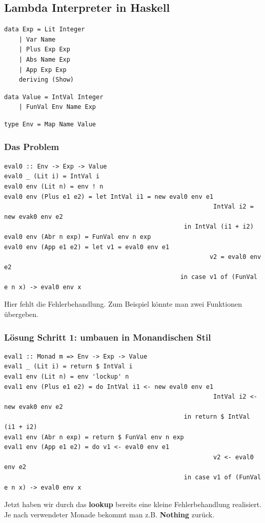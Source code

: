\documentclass[ngerman,a4paper]{report}
\begin{document}
\subsection{Lambda Interpreter in Haskell}
\begin{lstlisting}
data Exp = Lit Integer
	| Var Name
	| Plus Exp Exp
	| Abs Name Exp
	| App Exp Exp
	deriving (Show)
\end{lstlisting}

\begin{lstlisting}
data Value = IntVal Integer
	| FunVal Env Name Exp
\end{lstlisting}

\begin{lstlisting}
type Env = Map Name Value
\end{lstlisting}

\subsubsection{Das Problem}
\begin{lstlisting}
eval0 :: Env -> Exp -> Value
eval0 _ (Lit i) = IntVal i
eval0 env (Lit n) = env ! n
eval0 env (Plus e1 e2) = let IntVal i1 = new eval0 env e1
														 IntVal i2 = new evak0 env e2
												 in IntVal (i1 + i2)
eval0 env (Abr n exp) = FunVal env n exp
eval0 env (App e1 e2) = let v1 = eval0 env e1
														v2 = eval0 env e2
												in case v1 of (FunVal e n x) -> eval0 env x				
\end{lstlisting}
Hier fehlt die Fehlerbehandlung. Zum Beispiel könnte man zwei Funktionen übergeben.\\

\subsubsection{Lösung Schritt 1: umbauen in Monandischen Stil}
\begin{lstlisting}
eval1 :: Monad m => Env -> Exp -> Value
eval1 _ (Lit i) = return $ IntVal i
eval1 env (Lit n) = env 'lockup' n
eval1 env (Plus e1 e2) = do IntVal i1 <- new eval0 env e1
														 IntVal i2 <- new evak0 env e2
												 in return $ IntVal (i1 + i2)
eval1 env (Abr n exp) = return $ FunVal env n exp
eval1 env (App e1 e2) = do v1 <- eval0 env e1
														 v2 <- eval0 env e2
												 in case v1 of (FunVal e n x) -> eval0 env x				
\end{lstlisting}
Jetzt haben wir durch das \textbf{lookup} bereits eine kleine Fehlerbehandlung realisiert. Je nach verwendeter Monade bekommt man z.B. \textbf{Nothing} zurück.\\
\end{document}
